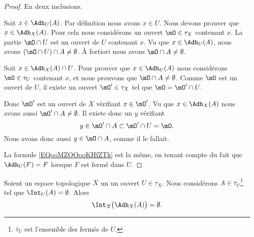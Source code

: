 \begin{proof}
	En deux inclusions.
	\begin{subproof}
		Soit \( x\in \Adh_U(A)\). Par définition nous avons \( x\in U\). Nous devons prouver que \( x\in \Adh_X(A)\). Pour cela nous considérons un ouvert \( \mO\in\tau_X\) contenant \( x\). La partie \( \mO\cap U\) est un ouvert de \( U\) contenant \( x\). Vu que \( x\in\Adh_U(A)\), nous avons \( (\mO\cap U)\cap A\neq \emptyset\). À fortiori nous avons \( \mO\cap A\neq\emptyset\).

		Soit \( x\in \Adh_X(A)\cap U\). Pour prouver que \( x\in\Adh_U(A)\) nous considérons \( \mO\in\tau_U\) contenant \( x\), et nous prouvons que \( \mO\cap A\neq\emptyset\). Comme \( \mO\) est un ouvert de \( U\), il existe un ouvert \( \mO'\in\tau_X\) tel que \( \mO=\mO'\cap U\).

		Donc \( \mO'\) est un ouvert de \( X\) vérifiant \( x\in\mO'\). Vu que \( x\in\Adh_X(A)\) nous avons aussi \( \mO'\cap A\neq \emptyset\). Il existe donc un \( y\) vérifiant
		\begin{equation}
			y\in\mO'\cap A\subset\mO'\cap U=\mO.
		\end{equation}
		Nous avons donc aussi \( y\in\mO\cap A\), comme il le fallait.
	\end{subproof}

	La formule \eqref{EQooMZOOooKHfZTk} est la même, en tenant compte du fait que \( \Adh_U(F)=F\) lorsque \( F\) est fermé dans \( U\).
\end{proof}

\begin{lemma}	\label{LEMooXCNDooDkbaip}
	Soient un espace topologique \( X\) un un ouvert \( U\in \tau_X\). Nous considérons \( A\in\bar\tau_U\)\footnote{\( \bar\tau_U\) est l'ensemble des fermés de \( U\).} tel que \( \Int_U(A)=\emptyset\). Alors
	\begin{equation}
		\Int_X\big( \Adh_X(A) \big)=\emptyset.
	\end{equation}
\end{lemma}

